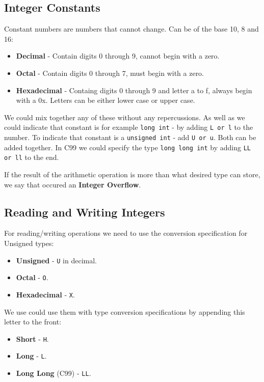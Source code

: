 \documentclass[openany]{book}
\begin{document}
    \subsection*{Integer Constants}
    Constant numbers are numbers that cannot change. Can be of the base 10, 8 and 16:
    \begin{itemize}
        \item \textbf{Decimal} - Contain digits 0 through 9, cannot begin with a zero.
        \item \textbf{Octal} - Contain digits 0 through 7, must begin with a zero.
        \item \textbf{Hexadecimal} - Containg digits 0 through 9 and letter a to f,
        always begin with a 0x. Letters can be either lower case or upper case.
    \end{itemize}

    We could mix together any of these without any repercussions. As well as we could
    indicate that constant is for example \texttt{long int} - by adding \texttt{L or l}
    to the number. To indicate that constant is a \texttt{unsigned int} -
    add \texttt{U or u}. Both can be added together. In C99 we could specify the type
    \texttt{long long int} by adding \texttt{LL or ll} to the end.

    \bigskip
    If the result of the arithmetic operation is more than what desired type can store,
    we say that occured an \textbf{Integer Overflow}.

    \subsection*{Reading and Writing Integers}
    For reading/writing operations we need to use the conversion specification
    for Unsigned types:
    \begin{itemize}
        \item \textbf{Unsigned} - \texttt{U} in decimal.
        \item \textbf{Octal} - \texttt{O}.
        \item \textbf{Hexadecimal} - \texttt{X}.
    \end{itemize} 
    We use could use them with type conversion specifications by appending this letter
    to the front:
    \begin{itemize}
        \item \textbf{Short} - \texttt{H}.
        \item \textbf{Long} - \texttt{L}.
        \item \textbf{Long Long} (C99) - \texttt{LL}.
    \end{itemize}
\end{document}
